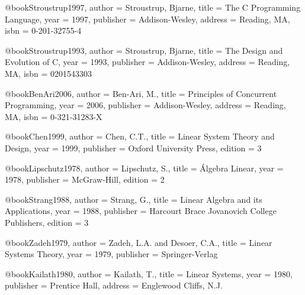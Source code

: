 @book{Stroustrup1997,
  author = {Stroustrup, Bjarne},
  title = {The C Programming Language},
  year = {1997},
  publisher = {Addison-Wesley},
  address = {Reading, MA},
  isbn = {0-201-32755-4}
}

@book{Stroustrup1993,
  author = {Stroustrup, Bjarne},
  title = {The Design and Evolution of C},
  year = {1993},
  publisher = {Addison-Wesley},
  address = {Reading, MA},
  isbn = {0201543303}
}

@book{BenAri2006,
  author = {Ben-Ari, M.},
  title = {Principles of Concurrent Programming},
  year = {2006},
  publisher = {Addison-Wesley},
  address = {Reading, MA},
  isbn = {0-321-31283-X}
}

%

@book{Chen1999,
  author = {Chen, C.T.},
  title = {Linear System Theory and Design},
  year = {1999},
  publisher = {Oxford University Press},
  edition = {3}
}

@book{Lipschutz1978,
  author = {Lipschutz, S.},
  title = {Álgebra Linear},
  year = {1978},
  publisher = {McGraw-Hill},
  edition = {2}
}

@book{Strang1988,
  author = {Strang, G.},
  title = {Linear Algebra and its Applications},
  year = {1988},
  publisher = {Harcourt Brace Jovanovich College Publishers},
  edition = {3}
}

@book{Zadeh1979,
  author = {Zadeh, L.A. and Desoer, C.A.},
  title = {Linear Systems Theory},
  year = {1979},
  publisher = {Springer-Verlag}
}

@book{Kailath1980,
  author = {Kailath, T.},
  title = {Linear Systems},
  year = {1980},
  publisher = {Prentice Hall},
  address = {Englewood Cliffs, N.J.}
}

